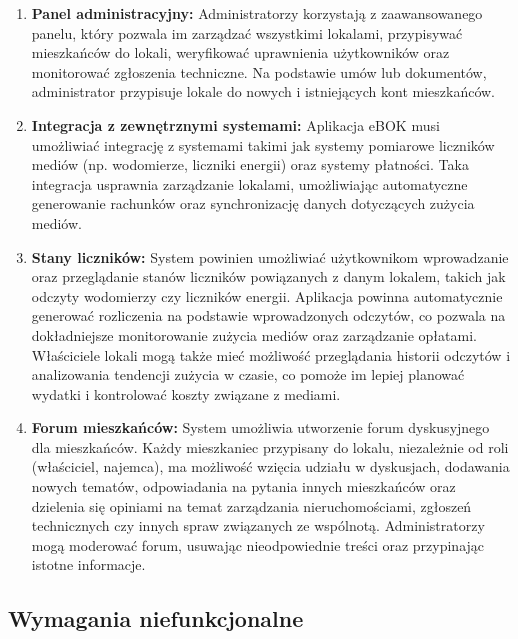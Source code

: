 \begin{enumerate}[label=\arabic*.]
	\item \textbf{Panel administracyjny:} Administratorzy korzystają z zaawansowanego panelu, który pozwala im zarządzać wszystkimi lokalami, przypisywać mieszkańców do lokali, weryfikować uprawnienia użytkowników oraz monitorować zgłoszenia techniczne. Na podstawie umów lub dokumentów, administrator przypisuje lokale do nowych i istniejących kont mieszkańców.

	\item \textbf{Integracja z zewnętrznymi systemami:} Aplikacja eBOK musi umożliwiać integrację z systemami takimi jak systemy pomiarowe liczników mediów (np. wodomierze, liczniki energii) oraz systemy płatności. Taka integracja usprawnia zarządzanie lokalami, umożliwiając automatyczne generowanie rachunków oraz synchronizację danych dotyczących zużycia mediów.

	\item \textbf{Stany liczników:} System powinien umożliwiać użytkownikom wprowadzanie oraz przeglądanie stanów liczników powiązanych z danym lokalem, takich jak odczyty wodomierzy czy liczników energii. Aplikacja powinna automatycznie generować rozliczenia na podstawie wprowadzonych odczytów, co pozwala na dokładniejsze monitorowanie zużycia mediów oraz zarządzanie opłatami. Właściciele lokali mogą także mieć możliwość przeglądania historii odczytów i analizowania tendencji zużycia w czasie, co pomoże im lepiej planować wydatki i kontrolować koszty związane z mediami.
	
	\item \textbf{Forum mieszkańców:} System umożliwia utworzenie forum dyskusyjnego dla mieszkańców. Każdy mieszkaniec przypisany do lokalu, niezależnie od roli (właściciel, najemca), ma możliwość wzięcia udziału w dyskusjach, dodawania nowych tematów, odpowiadania na pytania innych mieszkańców oraz dzielenia się opiniami na temat zarządzania nieruchomościami, zgłoszeń technicznych czy innych spraw związanych ze wspólnotą. Administratorzy mogą moderować forum, usuwając nieodpowiednie treści oraz przypinając istotne informacje.


\end{enumerate}


\subsection{Wymagania niefunkcjonalne}

